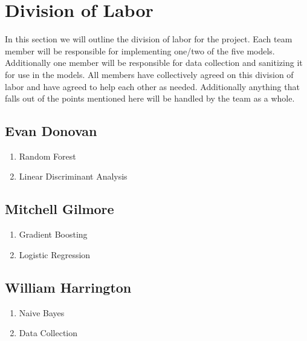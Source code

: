 \documentclass[10pt,twocolumn,letterpaper]{article}
\begin{document}
\section{Division of Labor}

In this section we will outline the division of labor for the project.
Each team member will be responsible for implementing one/two of the five models.
Additionally one member will be responsible for data collection and sanitizing it for use in the models.
All members have collectively agreed on this division of labor and have agreed to help each other as needed.
Additionally anything that falls out of the points mentioned here will be handled by the team as a whole.

\subsection{Evan Donovan}
\begin{enumerate}
  \item Random Forest
  \item Linear Discriminant Analysis
\end{enumerate}

\subsection{Mitchell Gilmore}
\begin{enumerate}
  \item Gradient Boosting
  \item Logistic Regression
\end{enumerate}

\subsection{William Harrington}
\begin{enumerate}
  \item Naive Bayes
  \item Data Collection
\end{enumerate}

{
  \small
  
  
}
\end{document}
